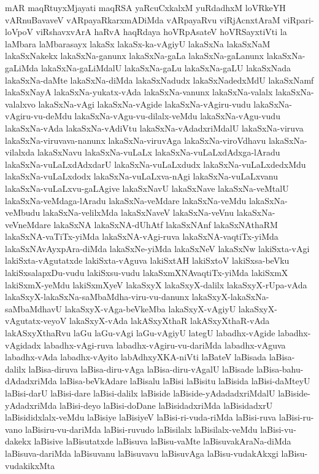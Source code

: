 {mAR
maqRtuyxMjayati
maqRSA
yaRcuCxkalxM
yuRdadhxM
loVRkeYH
vARnuBavaveV
vARpayaRkarxmADiMda
vARpayaRvu
viRjAcnxtAraM
viRpari-loVpoV
viRshavxvArA
haRvA
haqRdaya
hoVRpAsateV
hoVRSayxtiVti
la
laMbara
laMbarasayx
lakaSx
lakaSx-ka-vAgiyU
lakaSxNa
lakaSxNaM
lakaSxNakekx
lakaSxNa-ganunx
lakaSxNa-gaLa
lakaSxNa-gaLanunx
lakaSxNa-gaLiMda
lakaSxNa-gaLiMdalU
lakaSxNa-gaLu
lakaSxNa-gaLU
lakaSxNada
lakaSxNa-daMte
lakaSxNa-diMda
lakaSxNadudx
lakaSxNadedxMdU
lakaSxNamf
lakaSxNayA
lakaSxNa-yukatx-vAda
lakaSxNa-vanunx
lakaSxNa-valalx
lakaSxNa-valalxvo
lakaSxNa-vAgi
lakaSxNa-vAgide
lakaSxNa-vAgiru-vudu
lakaSxNa-vAgiru-vu-deMdu
lakaSxNa-vAgu-vu-dilalx-veMdu
lakaSxNa-vAgu-vudu
lakaSxNa-vAda
lakaSxNa-vAdiVtu
lakaSxNa-vAdadxriMdalU
lakaSxNa-viruva
lakaSxNa-viruvava-nanunx
lakaSxNa-viruvAga
lakaSxNa-viroVdhavu
lakaSxNa-vilalxda
lakaSxNavu
lakaSxNa-vuLaLx
lakaSxNa-vuLaLxdAdxga-lAradu
lakaSxNa-vuLaLxdAdxdarU
lakaSxNa-vuLaLxdudx
lakaSxNa-vuLaLxdedxMdu
lakaSxNa-vuLaLxdodx
lakaSxNa-vuLaLxva-nAgi
lakaSxNa-vuLaLxvanu
lakaSxNa-vuLaLxvu-gaLAgive
lakaSxNavU
lakaSxNave
lakaSxNa-veMtalU
lakaSxNa-veMdaga-lAradu
lakaSxNa-veMdare
lakaSxNa-veMdu
lakaSxNa-veMbudu
lakaSxNa-velilxMda
lakaSxNaveV
lakaSxNa-veVnu
lakaSxNa-veVneMdare
lakaSxNA
lakaSxNA-dUhAtf
lakaSxNAnf
lakaSxNAthaRM
lakaSxNA-vaTiTx-yiMda
lakaSxNA-vAgi-ruva
lakaSxNA-vaqtiTx-yiMda
lakaSxNAvAyxpAra-diMda
lakaSxNe-yiMda
lakaSxNeV
lakaSxNw
lakiSxta-vAgi
lakiSxta-vAgutatxde
lakiSxta-vAguva
lakiSxtAH
lakiSxtoV
lakiSxsa-beVku
lakiSxsalapxDu-vudu
lakiSxsu-vudu
lakaSxmXNAvaqtiTx-yiMda
lakiSxmX
lakiSxmX-yeMdu
lakiSxmXyeV
lakaSxyX
lakaSxyX-dalilx
lakaSxyX-rUpa-vAda
lakaSxyX-lakaSxNa-saMbaMdha-viru-vu-danunx
lakaSxyX-lakaSxNa-saMbaMdhavU
lakaSxyX-vAga-beVkeMba
lakaSxyX-vAgiyU
lakaSxyX-vAgutatx-veyoV
lakaSxyX-vAda
lakASxyXthaR
lakASxyXthaR-vAda
lakASxyXthaRvu
laGu
laGu-vAgi
laGu-vAgiyU
lategU
labadhx-vAgide
labadhx-vAgidadx
labadhx-vAgi-ruva
labadhx-vAgiru-vu-dariMda
labadhx-vAguva
labadhx-vAda
labadhx-vAyito
labAdhxyXKA-niVti
laBateV
laBisada
laBisa-dalilx
laBisa-diruva
laBisa-diru-vAga
laBisa-diru-vAgalU
laBisade
laBisa-bahu-dAdadxriMda
laBisa-beVkAdare
laBisalu
laBisi
laBisitu
laBisida
laBisi-daMteyU
laBisi-darU
laBisi-dare
laBisi-dalilx
laBiside
laBiside-yAdadadxriMdalU
laBiside-yAdadxriMda
laBisi-deyo
laBisi-doDane
laBisidadxriMda
laBisidadxrU
laBisididxlalx-veMdu
laBisiye
laBisiyeV
laBisi-ri-vuda-riMda
laBisi-ruva
laBisi-ru-vano
laBisiru-vu-dariMda
laBisi-ruvudo
laBisilalx
laBisilalx-veMdu
laBisi-vu-dakekx
laBisive
laBisutatxde
laBisuva
laBisu-vaMte
laBisuvakAraNa-diMda
laBisuva-dariMda
laBisuvanu
laBisuvavu
laBisuvAga
laBisu-vudakAkxgi
laBisu-vudakikxMta
}
